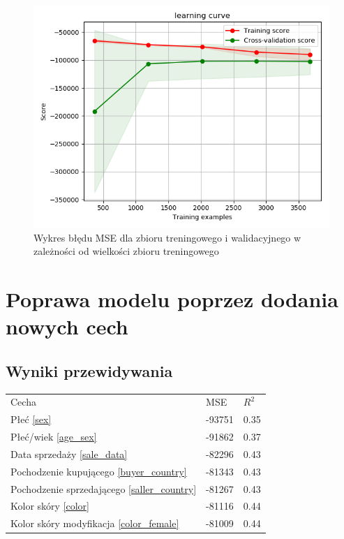 \documentclass[a4paper,12pt]{article}
\begin{document}
		\begin{figure}[h]
					\centering
					\includegraphics[scale=0.6]{obrazy/learning_curve.png} 
					\caption{Wykres błędu MSE dla zbioru treningowego i walidacyjnego w zależności od wielkości zbioru treningowego}
					\label{learning_curve}
		\end{figure}	
		
\section{Poprawa modelu poprzez dodania nowych cech}		
	\subsection{Wyniki przewidywania}
		\begin{tabular}{lll}
			Cecha			&	MSE		&	$R^2$\\
			Płeć \ref{sex}	&	-93751	&	0.35\\
			Płeć/wiek \ref{age_sex}	&	-91862	&	0.37\\
			Data sprzedaży	\ref{sale_data}	&	-82296	&	0.43\\
			Pochodzenie kupującego \ref{buyer_country}	&	-81343	&	0.43\\
			Pochodzenie sprzedającego	\ref{saller_country}	&	-81267	&	0.43\\
			Kolor skóry	\ref{color}	&	-81116	&	0.44\\
			Kolor skóry	modyfikacja \ref{color_female}	&	-81009	&	0.44\\
			
				
		\end{tabular}
\end{document}
